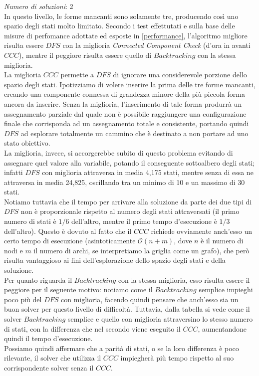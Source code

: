 \textit{Numero di soluzioni}: 2\\

In questo livello, le forme mancanti sono solamente tre, producendo così uno spazio degli stati molto limitato. Secondo i test effettutati e sulla base delle misure di perfomance adottate ed esposte in \ref{performance}, l'algoritmo migliore risulta essere $DFS$ con la miglioria \textit{Connected Component Check} (d'ora in avanti $CCC$), mentre il peggiore risulta essere quello di $Backtracking$ con la stessa miglioria.\\

La miglioria $CCC$ permette a $DFS$ di ignorare una considerevole porzione dello spazio degli stati. Ipotizziamo di volere inserire la prima delle tre forme mancanti, creando una componente connessa di grandezza minore della più piccola forma ancora da inserire. Senza la miglioria, l'inserimento di tale forma produrrà un assegnamento parziale dal quale non è possibile raggiungere una configurazione finale che corrisponda ad un assegnamento totale e consistente, portando quindi $DFS$ ad esplorare totalmente un cammino che è destinato a non portare ad uno stato obiettivo.\\
La miglioria, invece, si accorgerebbe subito di questo problema evitando di assegnare quel valore alla variabile, potando il conseguente sottoalbero degli stati; infatti $DFS$ con miglioria attraversa in media 4,175 stati, mentre senza di essa ne attraversa in media 24,825, oscillando tra un minimo di 10 e un massimo di 30 stati.\\
Notiamo tuttavia che il tempo per arrivare alla soluzione da parte dei due tipi di $DFS$ non è proporzionale rispetto al numero degli stati attraversati (il primo numero di stati è $1/6$ dell'altro, mentre il primo tempo d'esecuzione è $1/3$ dell'altro). Questo è dovuto al fatto che il $CCC$ richiede ovviamente anch'esso un certo tempo di esecuzione (asintoticamente  $\mathcal{O}(n + m)$, dove $n$ è il numero di nodi e $m$ il numero di archi, se interpretiamo la griglia come un grafo), che però risulta vantaggioso ai fini dell'esplorazione dello spazio degli stati e della soluzione.\\

Per quanto riguarda il $Backtracking$ con la stessa miglioria, esso risulta essere il peggiore per il seguente motivo: notiamo come il $Backtracking$ semplice impieghi poco più del $DFS$ con miglioria, facendo quindi pensare che anch'esso sia un buon solver per questo livello di difficoltà. Tuttavia, dalla tabella si vede come il solver $Backtracking$ semplice e quello con miglioria attraversino lo stesso numero di stati, con la differenza che nel secondo viene eseguito il $CCC$, aumentandone quindi il tempo d'esecuzione.\\
Possiamo quindi affermare che a parità di stati, o se la loro differenza è poco rilevante, il solver che utilizza il $CCC$ impiegherà più tempo rispetto al suo corrispondente solver senza il $CCC$.\\

